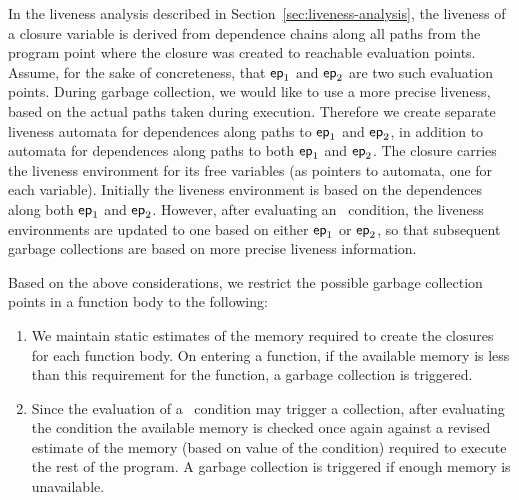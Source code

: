 \documentclass[9pt]{sigplanconf}
\begin{document}
In        the       liveness        analysis       described        in
Section~\ref{sec:liveness-analysis},   the  liveness   of  a   closure
variable is  derived from dependence  chains along all paths  from the
program point  where the closure  was created to  reachable evaluation
points.  Assume,  for the  sake of  concreteness, that  $\mathsf{ep}_1$ and
$\mathsf{ep}_2$ are two such evaluation points.  During garbage collection,
we would like to use a more precise liveness, based on the actual paths
taken  during  execution.   Therefore   we  create  separate  liveness
automata for dependences  along paths to $\mathsf{ep}_1$  and $\mathsf{ep}_2$, in
addition to  automata for dependences  along paths to  both $\mathsf{ep}_1$
and $\mathsf{ep}_2$.  The closure carries  the liveness environment for its
free  variables (as  pointers  to automata,  one  for each  variable).
Initially the liveness  environment is based on  the dependences along
both  $\mathsf{ep}_1$   and  $\mathsf{ep}_2$.   However,  after   evaluating  an
\SIF\ condition, the liveness environments are updated to one based on
either   $\mathsf{ep}_1$  or   $\mathsf{ep}_2$,  so   that  subsequent   garbage
collections are based on more precise liveness information.

Based on  the above considerations,  we restrict the  possible garbage
collection points in a function body to the following:
\begin{enumerate}
\item We  maintain static estimates  of the memory required  to create
  the closures for each function body.  On entering a function, if the
  available memory is  less than this requirement for  the function, a
  garbage collection is triggered.
\item Since the evaluation of a  \SIF\ condition may trigger a 
  collection, after evaluating the condition   the available memory
  is  checked once  again against  a  revised estimate  of the  memory
  (based on  value of the condition)  required to execute the  rest of
  the program.  A garbage collection is triggered if enough memory is unavailable.
\end{enumerate}



\end{document}
